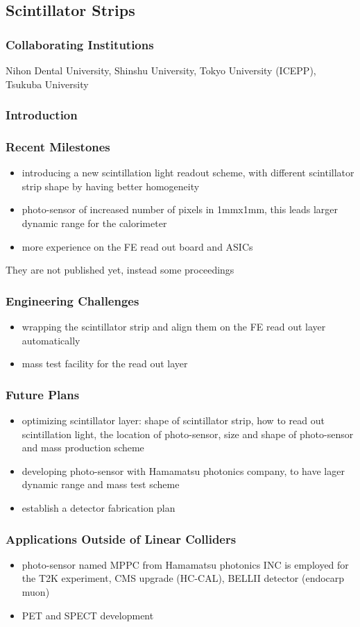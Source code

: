 \subsection{Scintillator Strips}
\subsubsection{Collaborating Institutions}
Nihon Dental University, Shinshu University, Tokyo University (ICEPP), Tsukuba University
\subsubsection{Introduction}
\subsubsection{Recent Milestones}
\begin{itemize}
	\item introducing a new scintillation light readout scheme, with different scintillator strip shape  by having better homogeneity 
	\item photo-sensor of increased number of pixels in 1mmx1mm, this leads larger dynamic range for the calorimeter
	\item more experience on the FE read out board and ASICs
\end{itemize}
They are not published yet, instead some proceedings 

\subsubsection{Engineering Challenges}
\begin{itemize}
	\item wrapping the scintillator strip and align them on the FE read out layer automatically 
	\item mass test facility for the read out layer
\end{itemize}

\subsubsection{Future Plans}
\begin{itemize}
	\item optimizing scintillator layer: shape of scintillator strip, how to read out scintillation light, the location of  photo-sensor, size and shape of photo-sensor and mass production scheme
	\item developing photo-sensor with Hamamatsu photonics company, to have lager dynamic range and mass test scheme
	\item establish a detector fabrication plan
\end{itemize}

\subsubsection{Applications Outside of Linear Colliders}
\begin{itemize}
	\item photo-sensor named MPPC from Hamamatsu photonics INC is employed for the T2K experiment, CMS upgrade (HC-CAL), BELLII detector (endocarp muon)
	\item PET and SPECT development 
\end{itemize}
